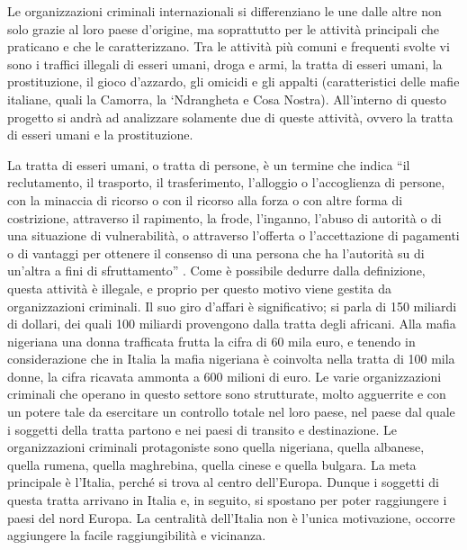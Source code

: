 \documentclass[a4paper, 11pt]{article}
\begin{document}
\newpage


Le organizzazioni criminali internazionali si differenziano le une dalle altre non solo grazie al loro paese d’origine, ma soprattutto per le attività principali che praticano e che le caratterizzano. Tra le attività più comuni e frequenti svolte vi sono i traffici illegali di esseri umani, droga e armi, la tratta di esseri umani, la prostituzione, il gioco d’azzardo, gli omicidi e gli appalti (caratteristici delle mafie italiane, quali la Camorra, la ‘Ndrangheta e Cosa Nostra). All’interno di questo progetto si andrà ad analizzare solamente due di queste attività, ovvero la tratta di esseri umani e la prostituzione.


La tratta di esseri umani, o tratta di persone, è un termine che indica “il reclutamento, il trasporto, il trasferimento, l’alloggio o l’accoglienza di persone, con la minaccia di ricorso o con il ricorso alla forza o con altre forma di costrizione, attraverso il rapimento, la frode, l’inganno, l’abuso di autorità o di una situazione di vulnerabilità, o attraverso l’offerta o l’accettazione di pagamenti o di vantaggi per ottenere il consenso di una persona che ha l’autorità su di un’altra a fini di sfruttamento” . Come è possibile dedurre dalla definizione, questa attività è illegale, e proprio per questo motivo viene gestita da organizzazioni criminali. Il suo giro d’affari è significativo; si parla di 150 miliardi di dollari, dei quali 100 miliardi provengono dalla tratta degli africani. Alla mafia nigeriana una donna trafficata frutta la cifra di 60 mila euro, e tenendo in considerazione che in Italia la mafia nigeriana è coinvolta nella tratta di 100 mila donne, la cifra ricavata ammonta a 600 milioni di euro. Le varie organizzazioni criminali che operano in questo settore sono strutturate, molto agguerrite e con un potere tale da esercitare un controllo totale nel loro paese, nel paese dal quale i soggetti della tratta partono e nei paesi di transito e destinazione. Le organizzazioni criminali protagoniste sono quella nigeriana, quella albanese, quella rumena, quella maghrebina, quella cinese e quella bulgara. La meta principale è l’Italia, perché si trova al centro dell’Europa. Dunque i soggetti di questa tratta arrivano in Italia e, in seguito, si spostano per poter raggiungere i paesi del nord Europa. La centralità dell’Italia non è l’unica motivazione, occorre aggiungere la facile raggiungibilità e vicinanza.

\newpage
\end{document}
